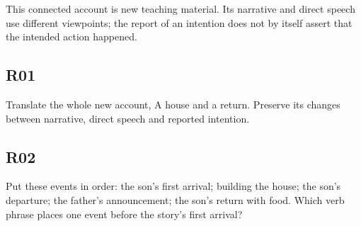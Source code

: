 This connected account is new teaching material. Its narrative and direct speech use different viewpoints; the report of an intention does not by itself assert that the intended action happened.

\par\begin{minipage}{\linewidth}\raggedright
{}
\end{minipage}\par

\subsection*{R01}

\par\begin{minipage}{\linewidth}\raggedright
Translate the whole new account, A house and a return. Preserve its changes between narrative, direct speech and reported intention.

\end{minipage}\par\addvspace{4pt}

\subsection*{R02}

\par\begin{minipage}{\linewidth}\raggedright
Put these events in order: the son’s first arrival; building the house; the son’s departure; the father’s announcement; the son’s return with food. Which verb phrase places one event before the story’s first arrival?

\end{minipage}\par\addvspace{4pt}


